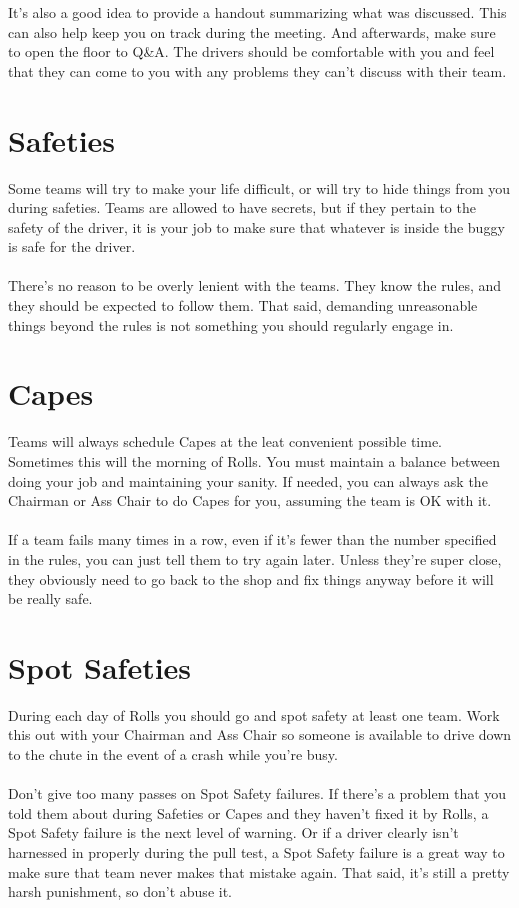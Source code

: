 It's also a good idea to provide a handout summarizing what was discussed.
This can also help keep you on track during the meeting. And afterwards,
make sure to open the floor to Q\&A. The drivers should be comfortable with
you and feel that they can come to you with any problems they can't discuss
with their team.

\section{Safeties}
\label{sec:Safeties}
Some teams will try to make your life difficult, or will try to hide things
from you during safeties. Teams are allowed to have secrets, but if they
pertain to the safety of the driver, it is your job to make sure that whatever
is inside the buggy is safe for the driver.
\\\\
There's no reason to be overly lenient with the teams. They know the rules,
and they should be expected to follow them. That said, demanding unreasonable
things beyond the rules is not something you should regularly engage in.

\section{Capes}
\label{sec:Capes}
Teams will always schedule Capes at the leat convenient possible time.
Sometimes this will the morning of Rolls. You must maintain a balance
between doing your job and maintaining your sanity. If needed, you can
always ask the Chairman or Ass Chair to do Capes for you, assuming the
team is OK with it.
\\\\
If a team fails many times in a row, even if it's fewer than the number
specified in the rules, you can just tell them to try again later. Unless
they're super close, they obviously need to go back to the shop and fix
things anyway before it will be really safe.

\section{Spot Safeties}
\label{sec:Spot Safeties}
During each day of Rolls you should go and spot safety at least one team.
Work this out with your Chairman and Ass Chair so someone is available to
drive down to the chute in the event of a crash while you're busy.
\\\\
Don't give too many passes on Spot Safety failures. If there's a
problem that you told them about during Safeties or Capes and they haven't
fixed it by Rolls, a Spot Safety failure is the next level of warning. Or if
a driver clearly isn't harnessed in properly during the pull test, a Spot
Safety failure is a great way to make sure that team never makes that mistake
again. That said, it's still a pretty harsh punishment, so don't abuse it.

